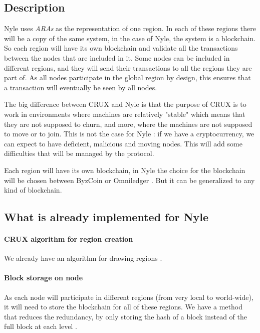 \documentclass[a4paper,11pt,oneside]{report}
\begin{document}
\subsection{Description}

Nyle uses \textit{ARAs} as the representation of one region. In each of these regions
there will be a copy of the same system, in the case of Nyle, the system is a
blockchain. So each region will have its own blockchain and validate all the
transactions between the nodes that are included in it. Some nodes can be
included in different regions, and they will send their transactions to all the
regions they are part of. As all nodes participate in the global region by design, this ensures that a transaction will eventually be seen by all nodes.

The big difference between CRUX \cite{Basescu2014} and Nyle is that the purpose
of CRUX \cite{Basescu2014} is to work in environments where machines are
relatively "stable" which means that they are not supposed to churn, and more, where the machines are not supposed to move or to join. This is not the
case for Nyle : if we have a cryptocurrency, we can expect to have deficient, malicious and moving nodes.  This will add some difficulties that will be
managed by the protocol.

Each region will have its own blockchain, in Nyle the choice for the blockchain
will be chosen between  ByzCoin
\cite{Kogias2016} or Omniledger \cite{Kokoris-Kogias2017}. But it can be generalized to any kind of blockchain.

\subsection{What is already implemented for Nyle} 
\paragraph{CRUX algorithm for region creation} 
We already have an algorithm for drawing regions \cite{Basescu2014}.

\paragraph{Block storage on node} As each node will participate in
different regions (from very local to world-wide), it will need to store the
blockchain for all of these regions. We have a method that reduces the
redundancy, by only storing the hash of a block instead of the full block at
each level \cite{Sierro2019}. 
\end{document}
